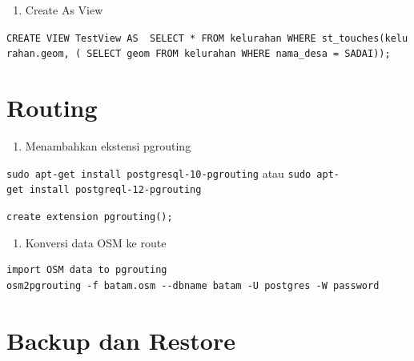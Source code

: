 \documentclass[]{book}
\providecommand{\tightlist}{%
  \setlength{\itemsep}{0pt}\setlength{\parskip}{0pt}}
\begin{document}
\begin{enumerate}
\def\labelenumi{\arabic{enumi}.}
\setcounter{enumi}{1}
\tightlist
\item
  Create As View
\end{enumerate}

\texttt{CREATE\ VIEW\ TestView\ AS\ \ SELECT\ *\ FROM\ kelurahan\ WHERE\ st\_touches(kelurahan.geom,\ (\ SELECT\ geom\ FROM\ kelurahan\ WHERE\ nama\_desa\ =\ \textquotesingle{}SADAI\textquotesingle{}));}

\hypertarget{routing}{%
\section{Routing}\label{routing}}

\begin{enumerate}
\def\labelenumi{\arabic{enumi}.}
\tightlist
\item
  Menambahkan ekstensi pgrouting
\end{enumerate}

\texttt{sudo\ apt-get\ install\ postgresql-10-pgrouting}
atau
\texttt{sudo\ apt-get\ install\ postgreql-12-pgrouting}

\texttt{create\ extension\ pgrouting();}

\begin{enumerate}
\def\labelenumi{\arabic{enumi}.}
\setcounter{enumi}{1}
\tightlist
\item
  Konversi data OSM ke route
\end{enumerate}

\begin{verbatim}
import OSM data to pgrouting
osm2pgrouting -f batam.osm --dbname batam -U postgres -W password
\end{verbatim}

\hypertarget{backup-dan-restore}{%
\section{Backup dan Restore}\label{backup-dan-restore}}
\end{document}
